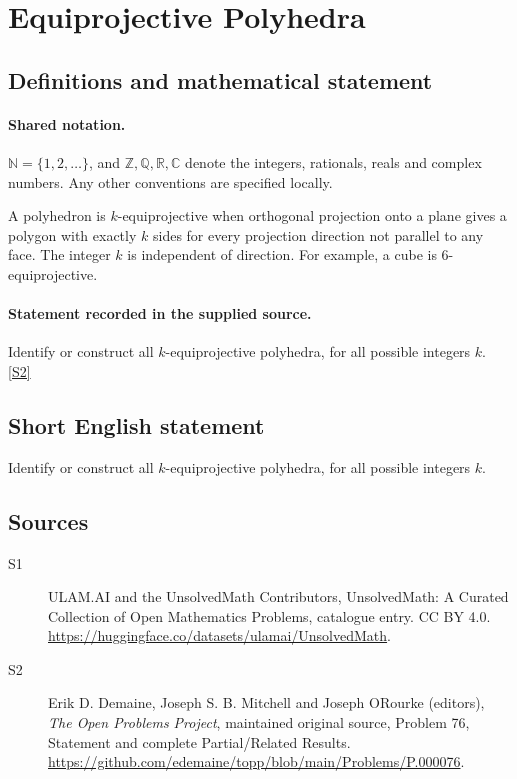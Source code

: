 \documentclass[11pt]{article}
\newcommand{\sref}[2]{\hyperlink{source:#1:#2}{[S#2]}}
\begin{document}
\section{Equiprojective Polyhedra}\label{statement}

\subsection{Definitions and mathematical statement}

\paragraph{Shared notation.}$\mathbb N=\{1,2,\ldots\}$, and $\mathbb Z,\mathbb Q,\mathbb R,\mathbb C$ denote the integers, rationals, reals and complex numbers. Any other conventions are specified locally.


A polyhedron is $k$-equiprojective when orthogonal projection onto a plane gives a polygon with exactly $k$ sides for every projection direction not parallel to any face. The integer $k$ is independent of direction. For example, a cube is $6$-equiprojective.
\paragraph{Statement recorded in the supplied source.}
Identify or construct all $k$-equiprojective polyhedra, for all possible integers $k$. \sref{statement}{2}
\subsection{Short English statement}
Identify or construct all $k$-equiprojective polyhedra, for all possible integers $k$.
\subsection{Sources}
\begin{description}
\item[\hypertarget{source:statement:1}{S1}] ULAM.AI and the UnsolvedMath Contributors, UnsolvedMath: A Curated Collection of Open Mathematics Problems, catalogue entry. CC BY 4.0. \url{https://huggingface.co/datasets/ulamai/UnsolvedMath}.
\item[\hypertarget{source:statement:2}{S2}] Erik D. Demaine, Joseph S. B. Mitchell and Joseph O\textquotesingle Rourke (editors), \emph{The Open Problems Project}, maintained original source, Problem 76, Statement and complete Partial/Related Results. \url{https://github.com/edemaine/topp/blob/main/Problems/P.000076}.
\end{description}
\label{end:statement}
\end{document}
